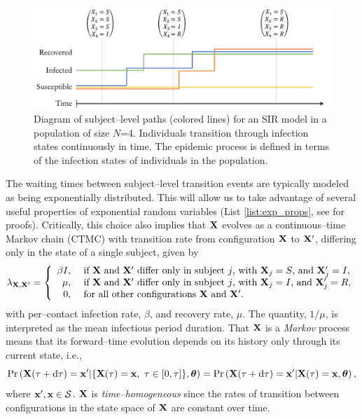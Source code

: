 \begin{figure}[htbp]
	\centering
	\includegraphics[width=0.8\linewidth]{figures/subject_sample_paths}
	\caption[Diagram of subject--level SIR paths.]{Diagram of subject--level paths (colored lines) for an SIR model in a population of size $ N$=4. Individuals transition through infection states continuously in time. The epidemic process is defined in terms of the infection states of individuals in the population.}
	\label{fig:subjectsamplepaths}
\end{figure}

The waiting times between subject--level transition events are typically modeled as being exponentially distributed. This will allow us to take advantage of several useful properties of exponential random variables (List \ref{list:exp_props}, see \cite{wilkinson2011stochastic} for proofs). Critically, this choice also implies that $ \mathbf{X} $ evolves as a continuous--time Markov chain (CTMC) with transition rate from configuration $ \mathbf{X} $ to $ \mathbf{X}^\prime $, differing only in the state of a single subject, given by
\begin{equation}
\lambda_{\mathbf{X},\mathbf{X}^\prime} = \left \lbrace \begin{array}{rl}
\beta I,\ &\text{if } \mathbf{X}\ \text{and } \mathbf{X}^\prime\ \text{differ only in subject }j \text{, with }\mathbf{X}_j=S\text{, and }\mathbf{X}_j^\prime=I,\\
\mu,\ &\text{if } \mathbf{X}\ \text{and } \mathbf{X}^\prime\ \text{differ only in subject }j \text{, with }\mathbf{X}_j=I\text{, and }\mathbf{X}_j^\prime=R,\\
0,\ & \text{for all other configurations }\mathbf{X}\ \text{and }\mathbf{X}^\prime.
\end{array}\right.
\end{equation}
with per--contact infection rate,  $ \beta $, and recovery rate, $ \mu $. The quantity, $ 1/\mu $, is interpreted as the mean infectious period duration. That $ \mathbf{X} $ is a \textit{Markov} process means that its forward--time evolution depends on its history only through its current state, i.e.,
\begin{equation}
\label{eqn:sir_markov}
\Pr\left (\bX(\tau + \dtau) = \bx^\prime | \lbrace\bX(\tau) = \bx,\ \tau\in[0,\tau]\rbrace, \btheta\right ) = \Pr\left (\bX(\tau + \dtau) = \bx^\prime | \bX(\tau) = \bx,\btheta\right ),
\end{equation}
where $ \mathbf{x}^\prime,\mathbf{x} \in \mathcal{S}$. $ \mathbf{X} $ is \textit{time--homogeneous} since the rates of transition between configurations in the state space of $ \mathbf{X} $ are constant over time. 

